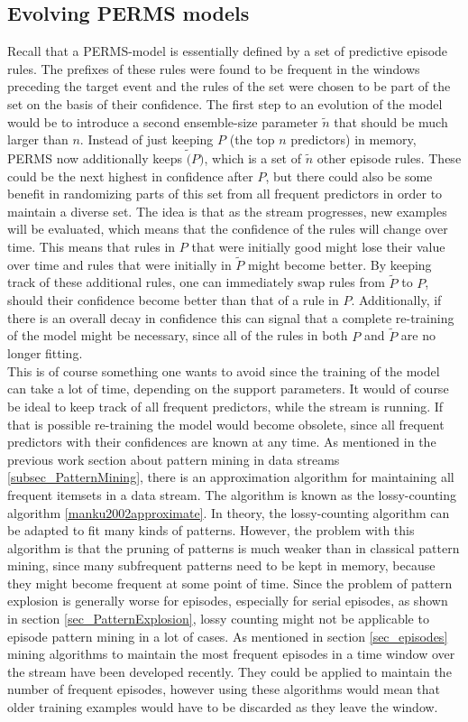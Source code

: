 \subsection{Evolving PERMS models}
Recall that a PERMS-model is essentially defined by a set of predictive episode rules. The prefixes of these rules were found to be frequent in the windows preceding the target event and the rules of the set were chosen to be part of the set on the basis of their confidence. The first step to an evolution of the model would be to introduce a second ensemble-size parameter $\tilde{n}$ that should be much larger than $n$. Instead of just keeping $P$ (the top $n$ predictors) in memory, PERMS now additionally keeps $\tilde(P)$, which is a set of $\tilde{n}$ other episode rules. These could be the next highest in confidence after $P$, but there could also be some benefit in randomizing parts of this set from all frequent predictors in order to maintain a diverse set. The idea is that as the stream progresses, new examples will be evaluated, which means that the confidence of the rules will change over time. This means that rules in $P$ that were initially good might lose their value over time and rules that were initially in $\tilde{P}$ might become better. By keeping track of these additional rules, one can immediately swap rules from $\tilde{P}$ to $P$, should their confidence become better than that of a rule in $P$. Additionally, if there is an overall decay in confidence this can signal that a complete re-training of the model might be necessary, since all of the rules in both $P$ and $\tilde{P}$ are no longer fitting. \\
This is of course something one wants to avoid since the training of the model can take a lot of time, depending on the support parameters. It would of course be ideal to keep track of all frequent predictors, while the stream is running. If that is possible re-training the model would become obsolete, since all frequent predictors with their confidences are known at any time. As mentioned in the previous work section about pattern mining in data streams \ref{subsec_PatternMining}, there is an approximation algorithm for maintaining all frequent itemsets in a data stream. The algorithm is known as the lossy-counting algorithm \ref{manku2002approximate}. In theory, the lossy-counting algorithm can be adapted to fit many kinds of patterns.  However, the problem with this algorithm is that the pruning of patterns is much weaker than in classical pattern mining, since many subfrequent patterns need to be kept in memory, because they might become frequent at some point of time. Since the problem of pattern explosion is generally worse for episodes, especially for serial episodes, as shown in section \ref{sec_PatternExplosion}, lossy counting might not be applicable to episode pattern mining in a lot of cases. As mentioned in section \ref{sec_episodes} mining algorithms to maintain the most frequent episodes in a time window over the stream have been developed recently. They could be applied to maintain the number of frequent episodes, however using these algorithms would mean that older training examples would have to be discarded as they leave the window.

